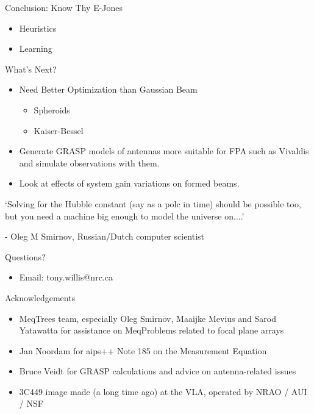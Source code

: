 \documentclass[pdf,azure,slideColor,colorBG]{prosper}
\begin{document}
\begin{slide}{Conclusion: Know Thy E-Jones}
\begin{itemize}
\item Heuristics
\item Learning
\end{itemize}
\end{slide}
\begin{slide}{What's Next?}
\begin{itemize}
\item Need Better Optimization than Gaussian Beam
\begin{itemize}
\item Spheroids
\item Kaiser-Bessel
\end{itemize}
\item Generate GRASP models of antennas more suitable for FPA such
as Vivaldis and simulate observations with them.
\item Look at effects of system gain variations on formed beams.
\end{itemize}
`Solving for the Hubble constant (say as a polc in time) should be
possible too, but you need a machine big enough to model the universe
on....'

- Oleg M Smirnov, Russian/Dutch computer scientist
\end{slide}

\begin{slide}{Questions?}
\begin{itemize}
\item Email: tony.willis@nrc.ca
\end{itemize}
\end{slide}                             

\begin{slide}{Acknowledgements}

\begin{small}
\begin{itemize}
\item MeqTrees team, especially Oleg Smirnov, Maaijke Mevius and Sarod Yatawatta for assistance on MeqProblems related to focal plane arrays
\item Jan Noordam for aips++ Note 185 on the Measurement Equation
\item Bruce Veidt for GRASP calculations and advice on antenna-related issues
\item 3C449 image made (a long time ago) at the VLA, operated by NRAO / AUI / NSF
\end{itemize}
\end{small}
\end{slide}
\end{document}
